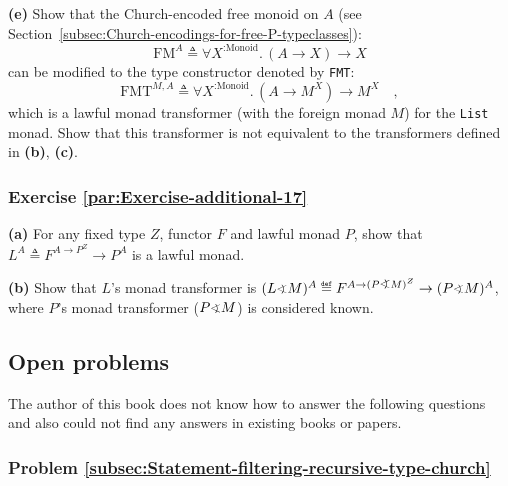 \textbf{(e)} Show that the Church-encoded free monoid on $A$ (see
Section~\ref{subsec:Church-encodings-for-free-P-typeclasses}):
\[
\text{FM}^{A}\triangleq\forall X^{:\text{Monoid}}.\,(A\rightarrow X)\rightarrow X
\]
can be modified to the type constructor denoted by \lstinline!FMT!:
\[
\text{FMT}^{M,A}\triangleq\forall X^{:\text{Monoid}}.\,(A\rightarrow M^{X})\rightarrow M^{X}\quad,
\]
which is a lawful monad transformer (with the foreign monad $M$)
for the \lstinline!List! monad. Show that this transformer is not
equivalent to the transformers defined in \textbf{(b)}, \textbf{(c)}.

\subsubsection{Exercise \label{par:Exercise-additional-17}\ref{par:Exercise-additional-17}}

\textbf{(a)} For any fixed type $Z$, functor $F$ and lawful monad
$P$, show that $L^{A}\triangleq F^{A\rightarrow P^{Z}}\rightarrow P^{A}$
is a lawful monad.

\textbf{(b)} Show that $L$\textsf{'}s monad transformer is $(L\varangle M)^{A}\triangleq F^{A\rightarrow(P\varangle M)^{Z}}\rightarrow(P\varangle M)^{A}$,
where $P$\textsf{'}s monad transformer ($P\varangle M$) is considered known.

\subsection{Open problems}

The author of this book does not know how to answer the following
questions and also could not find any answers in existing books or
papers.

\subsubsection{Problem \label{subsec:Statement-filtering-recursive-type-church}\ref{subsec:Statement-filtering-recursive-type-church}}

